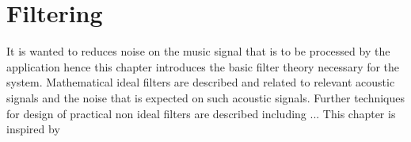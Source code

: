 \chapter{Filtering} \label{ch7}
It is wanted to reduces noise on the music signal that is to be processed by the application hence this chapter introduces the basic filter theory necessary for the system. Mathematical ideal filters are described and related to relevant acoustic signals and the noise that is expected on such acoustic signals. Further techniques for design of practical non ideal filters are described including ... This chapter is inspired by \cite{DTSP}      


